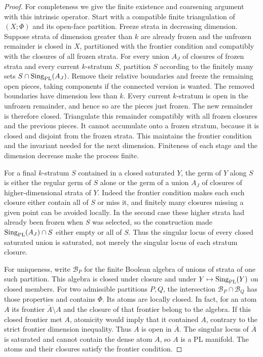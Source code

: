 \begin{proof}
For completeness we give the finite existence and coarsening
argument with this intrinsic operator. Start with a compatible
finite triangulation of $(X;\Phi)$ and its open-face partition.
Freeze strata in decreasing dimension. Suppose strata of dimension
greater than $k$ are already frozen and the unfrozen remainder
is closed in $X$, partitioned with the frontier condition and
compatibly with the closures of all frozen strata. For every union
$A_J$ of closures of frozen strata and every current $k$-stratum
$S$, partition $S$ according to the finitely many sets
$S\cap\operatorname{Sing}_{\rm PL}(A_J)$. Remove their relative
boundaries and freeze the remaining open pieces, taking components
if the connected version is wanted. The removed boundaries have
dimension less than $k$. Every current $k$-stratum is open in the
unfrozen remainder, and hence so are the pieces just frozen. The
new remainder is therefore closed. Triangulate this remainder
compatibly with all frozen closures and the previous pieces. It
cannot accumulate onto a frozen stratum, because it is closed and
disjoint from the frozen strata. This maintains the frontier
condition and the invariant needed for the next dimension. Finiteness
of each stage and the dimension decrease make the process finite.

For a final $k$-stratum $S$ contained in a closed saturated $Y$,
the germ of $Y$ along $S$ is either the regular germ of $S$ alone
or the germ of a union $A_J$ of closures of higher-dimensional
strata of $Y$. Indeed the frontier condition makes each such
closure either contain all of $S$ or miss it, and finitely many
closures missing a given point can be avoided locally. In the
second case these higher strata had already been frozen when $S$
was selected, so the construction made
$\operatorname{Sing}_{\rm PL}(A_J)\cap S$ either empty or all of
$S$. Thus the singular locus of every closed saturated union is
saturated, not merely the singular locus of each stratum closure.

For uniqueness, write $\mathcal B_P$ for the finite Boolean
algebra of unions of strata of one such partition. This algebra is
closed under closure and under $Y\mapsto\operatorname{Sing}_{\rm PL}(Y)$
on closed members. For two admissible partitions $P,Q$, the
intersection $\mathcal B_P\cap\mathcal B_Q$ has those properties
and contains $\Phi$. Its atoms are locally closed. In fact, for an
atom $A$ its frontier $\overline A\setminus A$ and the closure of
that frontier belong to the algebra. If this closed frontier met
$A$, atomicity would imply that it contained $A$, contrary to
the strict frontier dimension inequality. Thus $A$ is open in
$\overline A$. The singular locus of $\overline A$ is saturated
and cannot contain the dense atom $A$, so $A$ is a PL manifold.
The atoms and their closures satisfy the frontier condition.


\end{proof}

